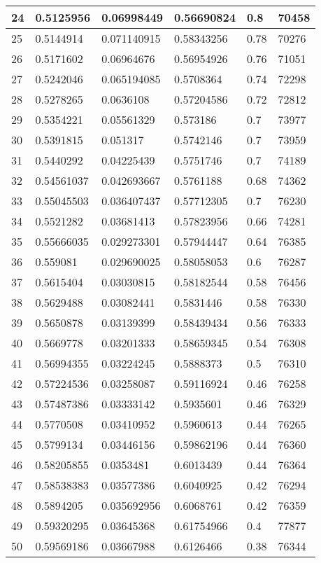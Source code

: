 \begin{longtable}{|l|l|l|l|l|l|}
24 & 0.5125956 & 0.06998449 & 0.56690824 & 0.8 & 70458 \\ \hline 
25 & 0.5144914 & 0.071140915 & 0.58343256 & 0.78 & 70276 \\ \hline 
26 & 0.5171602 & 0.06964676 & 0.56954926 & 0.76 & 71051 \\ \hline 
27 & 0.5242046 & 0.065194085 & 0.5708364 & 0.74 & 72298 \\ \hline 
28 & 0.5278265 & 0.0636108 & 0.57204586 & 0.72 & 72812 \\ \hline 
29 & 0.5354221 & 0.05561329 & 0.573186 & 0.7 & 73977 \\ \hline 
30 & 0.5391815 & 0.051317 & 0.5742146 & 0.7 & 73959 \\ \hline 
31 & 0.5440292 & 0.04225439 & 0.5751746 & 0.7 & 74189 \\ \hline 
32 & 0.54561037 & 0.042693667 & 0.5761188 & 0.68 & 74362 \\ \hline 
33 & 0.55045503 & 0.036407437 & 0.57712305 & 0.7 & 76230 \\ \hline 
34 & 0.5521282 & 0.03681413 & 0.57823956 & 0.66 & 74281 \\ \hline 
35 & 0.55666035 & 0.029273301 & 0.57944447 & 0.64 & 76385 \\ \hline 
36 & 0.559081 & 0.029690025 & 0.58058053 & 0.6 & 76287 \\ \hline 
37 & 0.5615404 & 0.03030815 & 0.58182544 & 0.58 & 76456 \\ \hline 
38 & 0.5629488 & 0.03082441 & 0.5831446 & 0.58 & 76330 \\ \hline 
39 & 0.5650878 & 0.03139399 & 0.58439434 & 0.56 & 76333 \\ \hline 
40 & 0.5669778 & 0.03201333 & 0.58659345 & 0.54 & 76308 \\ \hline 
41 & 0.56994355 & 0.03224245 & 0.5888373 & 0.5 & 76310 \\ \hline 
42 & 0.57224536 & 0.03258087 & 0.59116924 & 0.46 & 76258 \\ \hline 
43 & 0.57487386 & 0.03333142 & 0.5935601 & 0.46 & 76329 \\ \hline 
44 & 0.5770508 & 0.03410952 & 0.5960613 & 0.44 & 76265 \\ \hline 
45 & 0.5799134 & 0.03446156 & 0.59862196 & 0.44 & 76360 \\ \hline 
46 & 0.58205855 & 0.0353481 & 0.6013439 & 0.44 & 76364 \\ \hline 
47 & 0.58538383 & 0.03577386 & 0.6040925 & 0.42 & 76294 \\ \hline 
48 & 0.5894205 & 0.035692956 & 0.6068761 & 0.42 & 76359 \\ \hline 
49 & 0.59320295 & 0.03645368 & 0.61754966 & 0.4 & 77877 \\ \hline 
50 & 0.59569186 & 0.03667988 & 0.6126466 & 0.38 & 76344 \\ \hline 
\end{longtable}